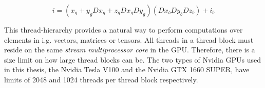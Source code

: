 \begin{equation}
  i = (x_g + y_gDx_g + z_gDx_gDy_g)(Dx_bDy_bDz_b) + i_b
\end{equation}

This thread-hierarchy provides a natural way to perform computations over elements in i.g. vectors, matrices or tensors.
All threads in a thread block must reside on the same \textit{stream multiprocessor core} in the GPU.
Therefore, there is a size limit on how large thread blocks can be.
The two types of Nvidia GPUs used in this thesis, the Nvidia Tesla V100 and the Nvidia GTX 1660 SUPER, have limits of 2048 and 1024 threads per thread block respectively.


